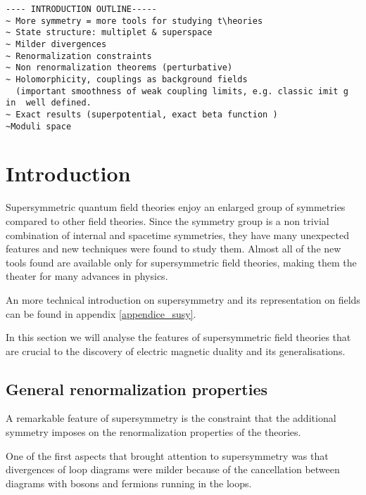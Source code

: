 \begin{lstlisting}
---- INTRODUCTION OUTLINE-----
~ More symmetry = more tools for studying t\heories
~ State structure: multiplet & superspace
~ Milder divergences 
~ Renormalization constraints
~ Non renormalization theorems (perturbative)
~ Holomorphicity, couplings as background fields 
  (important smoothness of weak coupling limits, e.g. classic imit g in  well defined.
~ Exact results (superpotential, exact beta function )
~Moduli space
\end{lstlisting}





\section{Introduction}
Supersymmetric quantum field theories enjoy an enlarged group of  symmetries compared to other field theories. 
Since the symmetry group is a non trivial combination of internal and spacetime symmetries, they have many unexpected features and new techniques were found to study them.
Almost all of the new tools found are available only for supersymmetric field theories, making them the theater for many advances in physics. 

An more technical introduction on supersymmetry and its representation on fields can be found in appendix \ref{appendice_susy}.

In this section we will analyse the features of supersymmetric field theories that are crucial to the discovery of electric magnetic duality and its generalisations.













\subsection{General renormalization properties}

A remarkable feature of supersymmetry is the constraint that the additional symmetry imposes on the renormalization properties of the theories.

One of the first aspects that brought attention to supersymmetry was that divergences of loop diagrams were milder because of the cancellation between diagrams with bosons and fermions running in the loops. 

